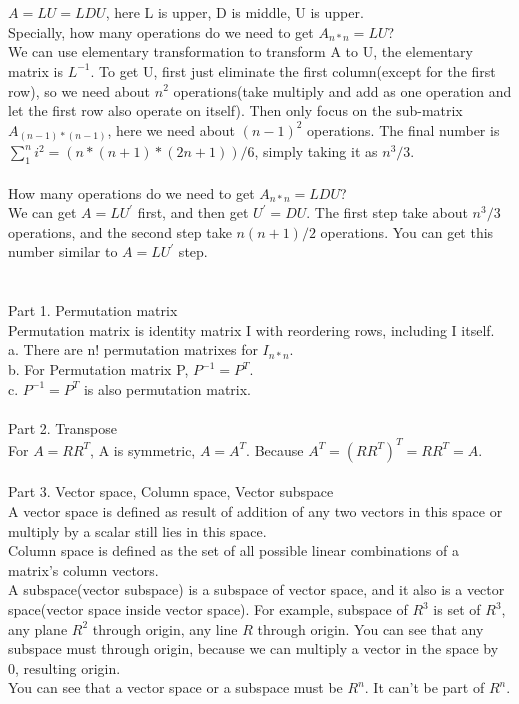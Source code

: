 \documentclass{article}
\begin{document}
\begin{spacing}{1.5}
\section{}
$A = LU = LDU$, here L is upper, D is middle, U is upper. \\
Specially, how many operations do we need to get $A_{n*n}=LU$?\\
We can use elementary transformation to transform A to U, the elementary matrix is $L^{-1}$. To get U, first just eliminate the first column(except for the first row), so we need about $n^2$ operations(take multiply and add as one operation and let the first row also operate on itself). Then only focus on the sub-matrix $A_{(n-1)*(n-1)}$, here we need about $(n-1)^2$ operations. The final number is $\sum_{1}^{n} i^2 = (n * (n + 1) * (2n + 1)) / 6$, simply taking it as $n^3/3$. \\
\\ How many operations do we need to get $A_{n*n}=LDU$? \\
We can get $A=LU^{'}$ first, and then get $U^{'}=DU$. The first step take about $n^3/3$ operations, and the second step take $n(n+1)/2$ operations. You can get this number similar to $A=LU^{'}$ step.


\section{}
Part 1. Permutation matrix \\
Permutation matrix is identity matrix I with reordering rows, including I itself. \\
a. There are n! permutation matrixes for $I_{n*n}$. \\
b. For Permutation matrix P, $P^{-1}=P^{T}$. \\
c. $P^{-1}=P^{T}$ is also permutation matrix. \\
\\ Part 2. Transpose \\
For $A=RR^T$, A is symmetric, $A=A^T$. Because $A^T=(RR^T)^T=RR^T=A$. \\
\\ Part 3. Vector space, Column space, Vector subspace \\
A vector space is defined as result of addition of any two vectors in this space or multiply by a scalar still lies in this space. \\
Column space is defined as the set of all possible linear combinations of a matrix's column vectors. \\
A subspace(vector subspace) is a subspace of vector space, and it also is a vector space(vector space inside vector space). For example, subspace of $R^3$ is set of $R^3$, any plane $R^2$ through origin, any line $R$ through origin. You can see that any subspace must through origin, because we can multiply a vector in the space by 0, resulting origin. \\
You can see that a vector space or a subspace must be $R^n$. It can't be part of $R^n$.



\end{spacing}
\end{document}

